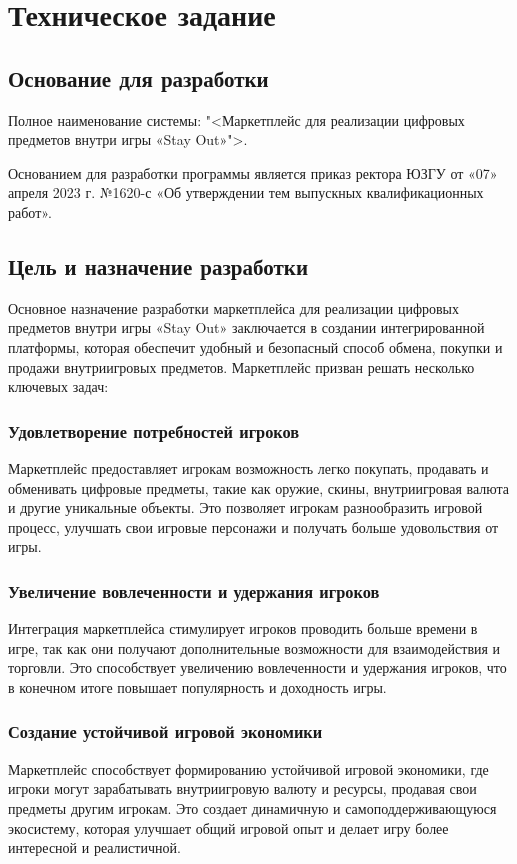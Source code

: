 \section{Техническое задание}
\subsection{Основание для разработки}

Полное наименование системы: "<Маркетплейс для реализации цифровых предметов внутри игры «Stay Out»">.

Основанием для разработки программы является приказ ректора ЮЗГУ от «07» апреля 2023 г. №1620-с «Об утверждении тем выпускных квалификационных работ».

\subsection{Цель и назначение разработки}

Основное назначение разработки маркетплейса для реализации цифровых предметов внутри игры «Stay Out» заключается в создании интегрированной платформы, которая обеспечит удобный и безопасный способ обмена, покупки и продажи внутриигровых предметов. Маркетплейс призван решать несколько ключевых задач:

\subsubsection{Удовлетворение потребностей игроков}
Маркетплейс предоставляет игрокам возможность легко покупать, продавать и обменивать цифровые предметы, такие как оружие, скины, внутриигровая валюта и другие уникальные объекты. Это позволяет игрокам разнообразить игровой процесс, улучшать свои игровые персонажи и получать больше удовольствия от игры.

\subsubsection{Увеличение вовлеченности и удержания игроков}
Интеграция маркетплейса стимулирует игроков проводить больше времени в игре, так как они получают дополнительные возможности для взаимодействия и торговли. Это способствует увеличению вовлеченности и удержания игроков, что в конечном итоге повышает популярность и доходность игры.

\subsubsection{Создание устойчивой игровой экономики}
Маркетплейс способствует формированию устойчивой игровой экономики, где игроки могут зарабатывать внутриигровую валюту и ресурсы, продавая свои предметы другим игрокам. Это создает динамичную и самоподдерживающуюся экосистему, которая улучшает общий игровой опыт и делает игру более интересной и реалистичной.

